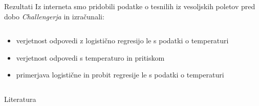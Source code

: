 \documentclass[10pt]{beamer}
\begin{document}
\begin{frame}{Rezultati}
    Iz interneta smo pridobili podatke o tesnilih iz vesoljskih poletov pred dobo \textit{Challengerja}
    in izračunali:
\begin{columns}
    \begin{column}{6.5cm}
    \begin{itemize}
        \item<1-> verjetnost odpovedi z logistično regresijo le s podatki o temperaturi
        \item<2-> verjetnost odpovedi s temperaturo in pritiskom
        \item<3> primerjava logistične in probit regresije le s podatki o temperaturi
    \end{itemize}
\end{column}
\begin{column}{4.5cm}
\end{column}
\end{columns}
\end{frame}

\begin{frame}{Literatura}
    
\end{frame}
\end{document}

